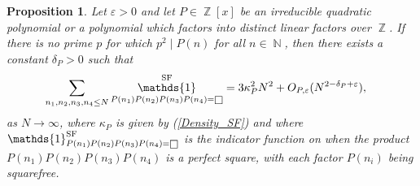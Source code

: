 \documentclass[11pts]{amsart}
\numberwithin{equation}{section}
\newtheorem{prop}{Proposition}[section]
\DeclareMathOperator{\Z}{\mathbb{Z}}
\DeclareMathOperator{\N}{\mathbb{N}}
\DeclareMathOperator{\one}{\mathds{1}}
\let\oldsquare\square
\renewcommand{\square}[1][-1pt]{%
 {\raisebox{#1}{$\oldsquare$}}%
}
\begin{document}
\begin{prop}
\label{counting_squares}
    Let $\varepsilon>0$ and let $P\in\Z[x]$ be an irreducible quadratic polynomial or a polynomial which factors into distinct linear factors over $\Z$. If there is no prime $p$ for which $p^2\mid  P(n)$ for all $n\in\N$, then there exists a constant $\delta_P>0$ such that
    \begin{align}
        \sum_{n_1,n_2,n_3,n_4\leq N}\one_{P(n_1)P(n_2)P(n_3)P(n_4)=\square}^{\text{SF}}
        &=
        3\kappa_P^2 N^2 + O_{P,\varepsilon}(N^{2-\delta_P+\varepsilon}),
    \end{align}
    as $N\rightarrow \infty$, where $\kappa_P$ is given by (\ref{Density_SF}) and where $\one_{P(n_1)P(n_2)P(n_3)P(n_4)=\square}^{\text{SF}}$ is the indicator function on when the product $P(n_1)P(n_2)P(n_3)P(n_4)$ is a perfect square, with each factor $P(n_i)$ being squarefree.
\end{prop}
\end{document}
